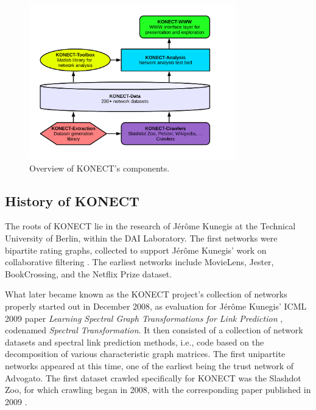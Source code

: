 \documentclass{article}
\newcommand{\wOnePointFive}{0.8\textwidth}
\begin{document}
\begin{figure}
  \centering
  \includegraphics[width=\wOnePointFive]{organization.white}
  \caption{
    \label{fig:organization}
    Overview of KONECT's components. 
  }
\end{figure}

\subsection{History of KONECT}
The roots of KONECT lie in the research of Jérôme Kunegis at the
Technical University of Berlin, within the DAI Laboratory.  The first
networks were bipartite rating graphs, collected to support Jérôme
Kunegis' work on collaborative filtering
\citep{kunegis:negative-resistance,kunegis:adapting-ratings}.  The
earliest networks include MovieLens, Jester, BookCrossing, and the Netflix Prize
dataset. 

What later became known as the KONECT project's collection of networks properly started out in December
2008,
as evaluation for Jérôme Kunegis' ICML 2009
paper \emph{Learning Spectral Graph Transformations for Link Prediction}
\citep{kunegis:spectral-transformation}, codenamed \emph{Spectral
  Transformation}.  It then consisted of a collection of network
datasets and spectral link prediction methods, i.e., code based on the
decomposition of various characteristic graph matrices.  
The first unipartite networks appeared at this time, one of the earliest
being the trust network of Advogato. 
The first dataset crawled specifically for KONECT was the Slashdot Zoo,
for which crawling began in 2008, with the corresponding paper published
in 2009 \citep{kunegis:slashdot-zoo}. 
\end{document}

